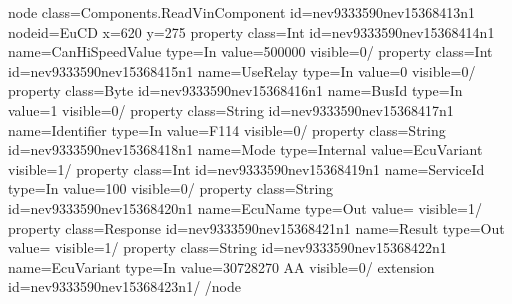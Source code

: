\documentclass[letterpaper,10pt,english]{sphinxmanual}
\begin{document}
\begin{sphinxVerbatim}[commandchars=\\\{\}]
\PYGZlt{}node class=\PYGZdq{}Components.ReadVinComponent\PYGZdq{} id=\PYGZdq{}nev9333590\PYGZhy{}nev15368413n1\PYGZdq{} nodeid=\PYGZdq{}EuCD\PYGZdq{} x=\PYGZdq{}620\PYGZdq{} y=\PYGZdq{}275\PYGZdq{}\PYGZgt{}
  \PYGZlt{}property class=\PYGZdq{}Int\PYGZdq{} id=\PYGZdq{}nev9333590\PYGZhy{}nev15368414n1\PYGZdq{} name=\PYGZdq{}CanHiSpeedValue\PYGZdq{} type=\PYGZdq{}In\PYGZdq{} value=\PYGZdq{}500000\PYGZdq{} visible=\PYGZdq{}0\PYGZdq{}/\PYGZgt{}
  \PYGZlt{}property class=\PYGZdq{}Int\PYGZdq{} id=\PYGZdq{}nev9333590\PYGZhy{}nev15368415n1\PYGZdq{} name=\PYGZdq{}UseRelay\PYGZdq{} type=\PYGZdq{}In\PYGZdq{} value=\PYGZdq{}0\PYGZdq{} visible=\PYGZdq{}0\PYGZdq{}/\PYGZgt{}
  \PYGZlt{}property class=\PYGZdq{}Byte\PYGZdq{} id=\PYGZdq{}nev9333590\PYGZhy{}nev15368416n1\PYGZdq{} name=\PYGZdq{}BusId\PYGZdq{} type=\PYGZdq{}In\PYGZdq{} value=\PYGZdq{}1\PYGZdq{} visible=\PYGZdq{}0\PYGZdq{}/\PYGZgt{}
  \PYGZlt{}property class=\PYGZdq{}String\PYGZdq{} id=\PYGZdq{}nev9333590\PYGZhy{}nev15368417n1\PYGZdq{} name=\PYGZdq{}Identifier\PYGZdq{} type=\PYGZdq{}In\PYGZdq{} value=\PYGZdq{}F114\PYGZdq{} visible=\PYGZdq{}0\PYGZdq{}/\PYGZgt{}
  \PYGZlt{}property class=\PYGZdq{}String\PYGZdq{} id=\PYGZdq{}nev9333590\PYGZhy{}nev15368418n1\PYGZdq{} name=\PYGZdq{}Mode\PYGZdq{} type=\PYGZdq{}Internal\PYGZdq{} value=\PYGZdq{}EcuVariant\PYGZdq{} visible=\PYGZdq{}1\PYGZdq{}/\PYGZgt{}
  \PYGZlt{}property class=\PYGZdq{}Int\PYGZdq{} id=\PYGZdq{}nev9333590\PYGZhy{}nev15368419n1\PYGZdq{} name=\PYGZdq{}ServiceId\PYGZdq{} type=\PYGZdq{}In\PYGZdq{} value=\PYGZdq{}100\PYGZdq{} visible=\PYGZdq{}0\PYGZdq{}/\PYGZgt{}
  \PYGZlt{}property class=\PYGZdq{}String\PYGZdq{} id=\PYGZdq{}nev9333590\PYGZhy{}nev15368420n1\PYGZdq{} name=\PYGZdq{}EcuName\PYGZdq{} type=\PYGZdq{}Out\PYGZdq{} value=\PYGZdq{}\PYGZdq{} visible=\PYGZdq{}1\PYGZdq{}/\PYGZgt{}
  \PYGZlt{}property class=\PYGZdq{}Response\PYGZdq{} id=\PYGZdq{}nev9333590\PYGZhy{}nev15368421n1\PYGZdq{} name=\PYGZdq{}Result\PYGZdq{} type=\PYGZdq{}Out\PYGZdq{} value=\PYGZdq{}\PYGZdq{} visible=\PYGZdq{}1\PYGZdq{}/\PYGZgt{}
  \PYGZlt{}property class=\PYGZdq{}String\PYGZdq{} id=\PYGZdq{}nev9333590\PYGZhy{}nev15368422n1\PYGZdq{} name=\PYGZdq{}EcuVariant\PYGZdq{} type=\PYGZdq{}In\PYGZdq{} value=\PYGZdq{}30728270 AA\PYGZdq{} visible=\PYGZdq{}0\PYGZdq{}/\PYGZgt{}
  \PYGZlt{}extension id=\PYGZdq{}nev9333590\PYGZhy{}nev15368423n1\PYGZdq{}/\PYGZgt{}
\PYGZlt{}/node\PYGZgt{}
\end{sphinxVerbatim}
\end{document}
